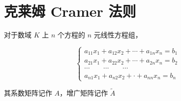\section{克莱姆 Cramer 法则}

对于数域 $K$ 上 $n$ 个方程的 $n$ 元线性方程组，

\begin{equation*}
	\left\{
	\begin{matrix}
		a_{11}x_1+a_{12}x_2+\cdots+a_{1n}x_n=b_1 \\
		a_{21}x_1+a_{22}x_2+\cdots+a_{2n}x_n=b_2 \\
		\cdots\qquad\cdots\qquad\cdots           \\
		a_{n1}x_1+a_{n2}x_2+\cdot +a_{nn}x_n=b_n
	\end{matrix}
	\right.
\end{equation*}

其系数矩阵记作 $A$，增广矩阵记作 $\widetilde{A}$